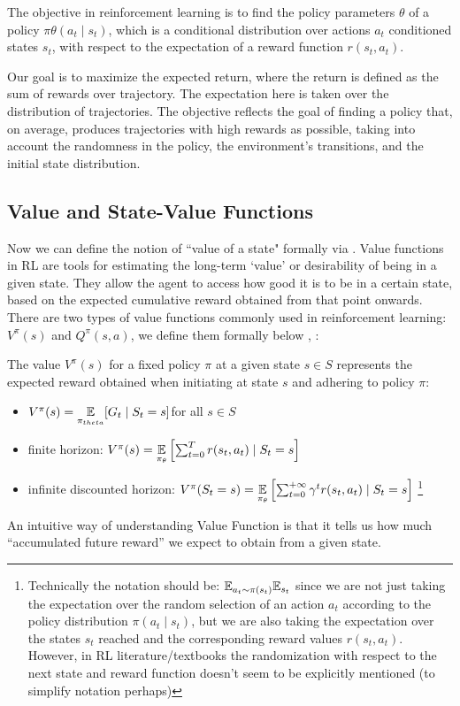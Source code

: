 The objective in reinforcement learning is to find the policy parameters $\theta$ of a policy $\pi{\theta}(a_t \mid s_t)$, which is a conditional distribution over actions $a_t$ conditioned states $s_t$, with respect to the expectation of a reward function $r(s_t, a_t)$. 

Our goal is to maximize the expected return, where the return is defined as the sum of rewards over trajectory. The expectation here is taken over the distribution of trajectories. The objective reflects the goal of finding a policy that, on average, produces trajectories with high rewards as possible, taking into account the randomness in the policy, the environment's transitions, and the initial state distribution. 

\subsection{Value and State-Value Functions}

Now we can define the notion of ``value of a state" formally via . Value functions in RL are tools for estimating the long-term `value' or desirability of being in a given state. They allow the agent to access how good it is to be in a certain state, based on the expected cumulative reward obtained from that point onwards. There are two types of value functions commonly used in reinforcement learning: $V^{\pi}(s)$ and $Q^{\pi}(s,a)$, we define them formally below \cite{RL}, \cite{mohri2018}:
\begin{definition}
    The value $V^{\pi}(s)$ for a fixed policy $\pi$ at a given state $s \in S$ represents the expected reward obtained when initiating at state $s$ and adhering to policy $\pi:$
    \begin{itemize}
        \item $V^{\pi}(s) = \underset{\pi_{theta}}{\mathbb E} [G_t \mid S_t = s]$for all $s \in S$ \cite{RL}
        \item finite horizon: $V^{\pi}(s) = \underset{\pi_{\theta}}{\mathbb E} \left[ \sum_{t=0}^T r(s_t,a_t) \mid S_t =s
        \right]$ \cite{mohri2018}
        \item infinite discounted horizon: $V^{\pi}(S_t = s) = \underset{\pi_{\theta}}{\mathbb E} \left[ \sum_{t=0}^{+ \infty} \gamma^t r(s_t,a_t) \mid S_t =s
        \right]$ \cite{mohri2018}     \footnote{Technically the notation should be: $\mathbb E_{a_t \sim \pi(s_t)} \mathbb E_{s_t}$ since
    we are not just taking the expectation over the random selection of an action $a_t$ according to the policy distribution $\pi(a_t \mid s_t)$, but we are also taking the expectation over the states $s_t$ reached and the corresponding reward values $r(s_t, a_t)$. However, in RL literature/textbooks the randomization with respect to the next state and reward function doesn't seem to be  explicitly mentioned (to simplify notation perhaps)} 
    \end{itemize}
\end{definition}
An intuitive way of understanding Value Function is that it tells us how much ``accumulated future reward'' we expect to obtain from a given state.

